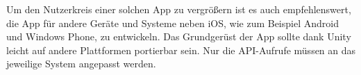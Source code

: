 Um den Nutzerkreis einer solchen App zu vergrößern ist es auch empfehlenswert, die App für andere Geräte und Systeme neben iOS, wie zum Beispiel Android und Windows Phone,  zu entwickeln. Das Grundgerüst der App sollte dank Unity leicht auf andere Plattformen portierbar sein. Nur die API-Aufrufe müssen an das jeweilige System angepasst werden.